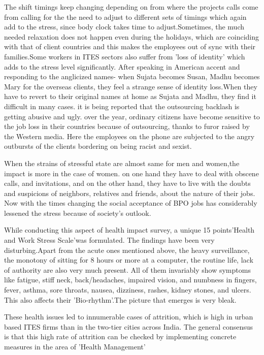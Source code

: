 The shift timings keep changing depending on from where the projects calls come from calling for the the need to adjust to different sets of timings which again add to the stress, since body clock takes time to adjust.Sometimes, the much needed relaxation does not happen even during the holidays, which are coinciding with that of client countries and this makes the employees out of sync with their families.Some workers in ITES sectors also suffer from 'loss of identity' which adds to the stress level significantly. After speaking in American accent and responding to the anglicized names- when Sujata becomes Susan, Madhu becomes Mary for the overseas clients, they feel a strange sense of identity loss.When they have to revert to their original names at home as Sujata and Madhu, they find it difficult in many cases. it is being reported that the outsourcing backlash is getting abusive and ugly. over the year, ordinary citizens have become sensitive to the job loss in their countries because of outsourcing, thanks to furor raised by the Western media. Here the employees on the phone are subjected to the angry outbursts of the clients bordering on being racist and sexist.

When the strains of stressful state are almost same for men and women,the impact is more in the case of women. on one hand they have to deal with obscene calls, and invitations, and on the other hand, they have to live with the doubts and suspicions of neighbors, relatives and friends, about the nature of their jobs. Now with the times changing the social acceptance of BPO jobs has considerably lessened the stress because of society's outlook.

While conducting this aspect of health impact survey, a unique 15 points'Health and Work Stress Scale'was formulated. The findings have been very disturbing.Apart from the acute ones mentioned above, the heavy surveillance, the monotony of sitting for 8 hours or more at a computer, the routine life, lack of authority are also very much present. All of them invariably show symptoms like fatigue, stiff neck, back/headaches, impaired vision, and numbness in fingers, fever, asthma, sore throats, nausea, dizziness, rashes, kidney stones, and ulcers. This also affects their 'Bio-rhythm'.The picture that emerges is very bleak. 

These health issues led to innumerable cases of attrition, which is high in urban based ITES firms than in the two-tier cities across India. The general consensus is that this high rate of attrition can be checked by implementing concrete measures in the area of 'Health Management'

